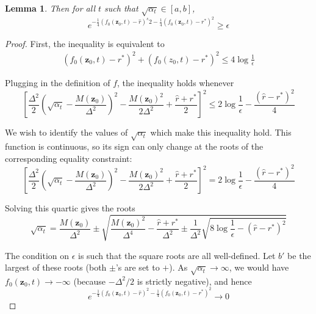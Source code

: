 \documentclass[11pt]{article}
\newcommand{\fitparenth}[1]{\left(#1\right)}
\newcommand{\fitbracket}[1]{\left[#1\right]}
\newcommand{\vect}[1]{\mathbf{#1}}
\theoremstyle{plain}
\newtheorem{lemma}[theorem]{Lemma}
\newcommand{\1}{\mathbbm{1}}
\newcommand{\separation}{\Delta}
\begin{document}
\begin{appendices}
\begin{lemma}
    Then for all $t$ such that $\sqrt{\alpha_t}\in [a,b]$, 
    \[e^{-\frac{1}{4}\fitparenth{f_0(\vect z_0,t)-\hat r }^s2-\frac{1}{4}\fitparenth{f_0(\vect z_0,t)-r^*}^2} \geq \epsilon\]
\end{lemma}

\begin{proof}
    First, the inequality is equivalent to 
    \begin{align*}
       \fitparenth{f_0(\vect z_0,t)-r^*}^2+\fitparenth{f_0(z_0,t)-r^*}^2\leq 4\log \frac{1}{\epsilon}
    \end{align*}

    
    
    
    Plugging in the definition of $f$, the inequality holds whenever 
    \[\fitbracket{\frac{\separation^2}{2} \fitparenth{\sqrt{\alpha_t}-\frac{M(\vect z_0)}{\separation^2}}^2 - \frac{M(\vect z_0)^2}{2\separation^2}+ \frac{\hat r+r^*}{2}}^2 \leq 2\log \frac{1}{\epsilon}-\frac{(\hat r-r^*)^2}{4} \]
    
    We wish to identify the values of $\sqrt{\alpha_t}$ which make this inequality hold. This function is continuous, so its sign can only change at the roots of the corresponding equality constraint:
    \[\fitbracket{\frac{\separation^2}{2} \fitparenth{\sqrt{\alpha_t}-\frac{M(\vect z_0)}{\separation^2}}^2 - \frac{M(\vect z_0)^2}{2\separation^2}+ \frac{\hat r+r^*}{2}}^2 = 2\log \frac{1}{\epsilon}-\frac{(\hat r -r^*)^2}{4}\]

    Solving this quartic gives the roots
    \[\sqrt{\alpha_t}=\frac{M(\vect z_0)}{\separation^2} \pm\sqrt{\frac{M(\vect z_0)^2}{\separation^4}-\frac{\hat r+r^*}{\separation^2}\pm \frac{1}{\separation^2}\sqrt{8\log \frac{1}{\epsilon}-(\hat r-r^*)^2}}\]
    
    The condition on $\epsilon$ is such that the square roots are all well-defined. Let $b'$ be the largest of these roots (both $\pm$'s are set to $+$). As $\sqrt{\alpha_t}\rightarrow \infty$, we would have $f_0(\vect z_0,t)\rightarrow -\infty$ (because $-\separation^2/2$ is strictly negative), and hence 
    \[e^{-\frac{1}{4}\fitparenth{f_0(\vect z_0,t)-\hat r }^2-\frac{1}{4}\fitparenth{f_0(\vect z_0,t)-r^*}^2} \rightarrow 0\]
    

\end{proof}
\end{appendices}
\end{document}
